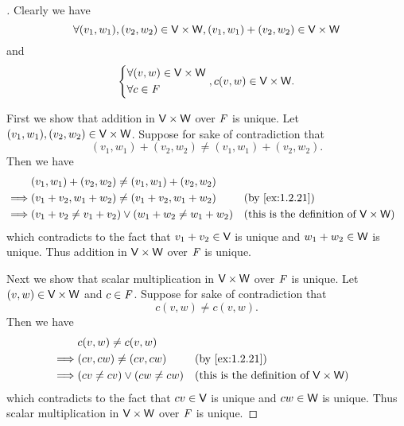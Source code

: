 \begin{proof}[]
	Clearly we have
	\[
		\forall (v_1, w_1), (v_2, w_2) \in \mathsf{V} \times \mathsf{W}, (v_1, w_1) + (v_2, w_2) \in \mathsf{V} \times \mathsf{W}
	\]
	and
	\[
		\begin{dcases}
			\forall (v, w) \in \mathsf{V} \times \mathsf{W} \\
			\forall c \in \mathit{F}
		\end{dcases}, c (v, w) \in \mathsf{V} \times \mathsf{W}.
	\]

	First we show that addition in \(\mathsf{V} \times \mathsf{W}\) over \(\mathit{F}\) is unique.
	Let \((v_1, w_1), (v_2, w_2) \in \mathsf{V} \times \mathsf{W}\).
	Suppose for sake of contradiction that
	\[
		(v_1, w_1) + (v_2, w_2) \neq (v_1, w_1) + (v_2, w_2).
	\]
	Then we have
	\begin{align*}
		         & (v_1, w_1) + (v_2, w_2) \neq (v_1, w_1) + (v_2, w_2)                                                                \\
		\implies & (v_1 + v_2, w_1 + w_2) \neq (v_1 + v_2, w_1 + w_2)         &  & \text{(by \cref{ex:1.2.21})}                        \\
		\implies & (v_1 + v_2 \neq v_1 + v_2) \lor (w_1 + w_2 \neq w_1 + w_2) &  & \text{(this is the definition of \(\V \times \W\))}
	\end{align*}
	which contradicts to the fact that \(v_1 + v_2 \in \mathsf{V}\) is unique and \(w_1 + w_2 \in \mathsf{W}\) is unique.
	Thus addition in \(\mathsf{V} \times \mathsf{W}\) over \(\mathit{F}\) is unique.

	Next we show that scalar multiplication in \(\mathsf{V} \times \mathsf{W}\) over \(\mathit{F}\) is unique.
	Let \((v, w) \in \mathsf{V} \times \mathsf{W}\) and \(c \in \mathit{F}\).
	Suppose for sake of contradiction that
	\[
		c(v, w) \neq c(v, w).
	\]
	Then we have
	\begin{align*}
		         & c(v, w) \neq c(v, w)                                                                    \\
		\implies & (cv, cw) \neq (cv, cw)         &  & \text{(by \cref{ex:1.2.21})}                        \\
		\implies & (cv \neq cv) \lor (cw \neq cw) &  & \text{(this is the definition of \(\V \times \W\))}
	\end{align*}
	which contradicts to the fact that \(cv \in \mathsf{V}\) is unique and \(cw \in \mathsf{W}\) is unique.
	Thus scalar multiplication in \(\mathsf{V} \times \mathsf{W}\) over \(\mathit{F}\) is unique.


\end{proof}
